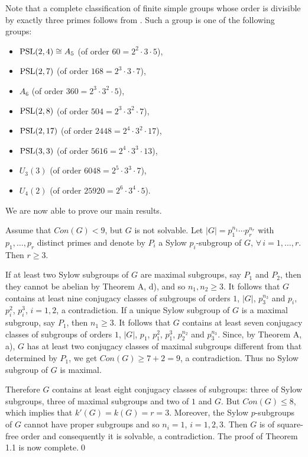 \documentclass[12pt]{article}
\newcommand{\0}{{\leqno}}
\begin{document}
Note that a complete classification of finite simple groups whose order is divisible by exactly three primes follows from \cite{8}. Such a group is one of the following groups:
\begin{itemize}
\item[-] ${\rm PSL}(2,4)\cong A_5$ (of order $60=2^2\cdot 3\cdot 5$),
\item[-] ${\rm PSL}(2,7)$ (of order $168=2^3\cdot 3\cdot 7$),\newpage
\item[-] $A_6$ (of order $360=2^3\cdot 3^2\cdot 5$),
\item[-] ${\rm PSL}(2,8)$ (of order $504=2^3\cdot 3^2\cdot 7$),
\item[-] ${\rm PSL}(2,17)$ (of order $2448=2^4\cdot 3^2\cdot 17$),
\item[-] ${\rm PSL}(3,3)$ (of order $5616=2^4\cdot 3^3\cdot 13$),
\item[-] $U_3(3)$ (of order $6048=2^5\cdot 3^3\cdot 7$),
\item[-] $U_4(2)$ (of order $25920=2^6\cdot 3^4\cdot 5$).
\end{itemize}

We are now able to prove our main results.

\bigskip{} Assume that $Con(G)<9$, but $G$ is not sol\-va\-ble. Let $|G|=p_1^{n_1}\cdots p_r^{n_r}$ with $p_1, \dots, p_r$ distinct primes and denote by $P_i$ a Sylow $p_i$-subgroup of $G$, $\forall\, i=1, \dots, r$. Then $r\geq 3$.

If at least two Sylow subgroups of $G$ are maximal subgroups, say $P_1$ and $P_2$, then they cannot be abelian by Theorem A, d), and so $n_1,n_2\geq 3$. It follows that $G$ contains at least nine conjugacy classes of subgroups of orders $1$, $|G|$, $p_3^{n_3}$ and $p_i$, $p_i^2$, $p_i^3$, $i=1,2$, a contradiction. If a unique Sylow subgroup of $G$ is a maximal subgroup, say $P_1$, then $n_1\geq 3$. It follows that $G$ contains at least seven conjugacy classes of subgroups of orders $1$, $|G|$, $p_1$, $p_1^2$, $p_1^3$, $p_2^{n_2}$ and $p_3^{n_3}$. Since, by Theorem A, a), $G$ has at least two conjugacy classes of maximal subgroups different from that determined by $P_1$, we get $Con(G)\geq 7+2=9$, a contradiction. Thus no Sylow subgroup of $G$ is maximal.

Therefore $G$ contains at least eight conjugacy classes of subgroups: three of Sylow subgroups, three of maximal subgroups and two of $1$ and $G$. But $Con(G)\leq 8$, which implies that $k'(G)=k(G)=r=3$. Moreover, the Sylow $p$-subgroups of $G$ cannot have proper subgroups and so $n_i=1$, $i=1,2,3$. Then $G$ is of square-free order and consequently it is solvable, a contradiction. The proof of Theorem 1.1 is now complete.\qed
\end{document}
